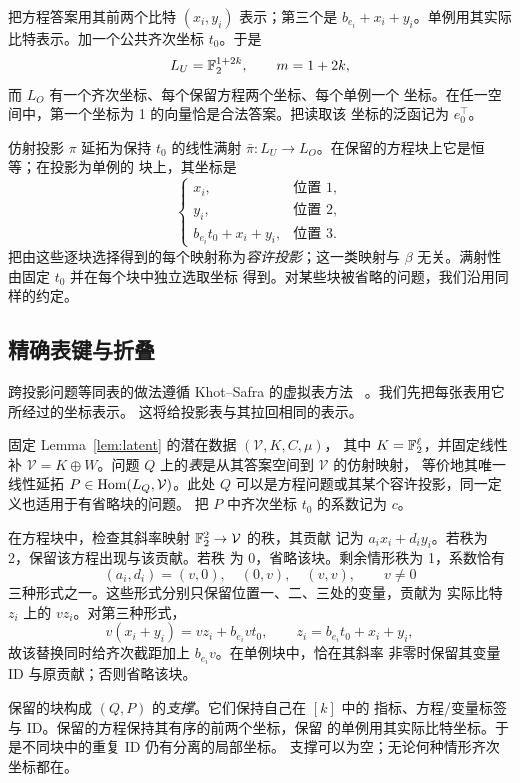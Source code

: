 把方程答案用其前两个比特 \((x_i,y_i)\) 表示；第三个是
\(b_{e_i}+x_i+y_i\)。单例用其实际比特表示。加一个公共齐次坐标
\(t_0\)。于是
\[
 L_U=\mathbb F_2^{1+2k},\qquad m=1+2k,
\]
而 \(L_O\) 有一个齐次坐标、每个保留方程两个坐标、每个单例一个
坐标。在任一空间中，第一个坐标为 1 的向量恰是合法答案。把读取该
坐标的泛函记为 \(e_0^\top\)。

仿射投影 \(\pi\) 延拓为保持 \(t_0\) 的线性满射
\(\bar\pi:L_U\to L_O\)。在保留的方程块上它是恒等；在投影为单例的
块上，其坐标是
\begin{equation}
 \begin{cases}
 x_i,&\text{位置 }1,\\
 y_i,&\text{位置 }2,\\
 b_{e_i}t_0+x_i+y_i,&\text{位置 }3.
 \end{cases}
 \label{eq:outer-projection}
\end{equation}
把由这些逐块选择得到的每个映射称为\emph{容许投影}；这一类映射与
\(\beta\) 无关。满射性由固定 \(t_0\) 并在每个块中独立选取坐标
得到。对某些块被省略的问题，我们沿用同样的约定。

\subsection{精确表键与折叠}

跨投影问题等同表的做法遵循 Khot--Safra 的虚拟表方法
~\cite[Section~1.1]{KS13}。我们先把每张表用它所经过的坐标表示。
这将给投影表与其拉回相同的表示。

固定 Lemma~\ref{lem:latent} 的潜在数据 \((\mathcal V,K,C,\mu)\)，
其中 \(K=\mathbb F_2^\ell\)，并固定线性补 \(\mathcal V=K\oplus W\)。问题
\(Q\) 上的\emph{表}是从其答案空间到 \(\mathcal V\) 的仿射映射，
等价地其唯一线性延拓 \(P\in\operatorname{Hom}(L_Q,\mathcal V)\)。此处 \(Q\)
可以是方程问题或其某个容许投影，同一定义也适用于有省略块的问题。
把 \(P\) 中齐次坐标 \(t_0\) 的系数记为 \(c\)。

在方程块中，检查其斜率映射 \(\mathbb F_2^2\to\mathcal V\) 的秩，其贡献
记为 \(a_i x_i+d_i y_i\)。若秩为 2，保留该方程出现与该贡献。若秩
为 0，省略该块。剩余情形秩为 1，系数恰有
\[
 (a_i,d_i)=(v,0),\quad (0,v),\quad (v,v),
 \qquad v\ne0
\]
三种形式之一。这些形式分别只保留位置一、二、三处的变量，贡献为
实际比特 \(z_i\) 上的 \(v z_i\)。对第三种形式，
\[
 v(x_i+y_i)=v z_i+b_{e_i}v t_0,
 \qquad z_i=b_{e_i}t_0+x_i+y_i,
\]
故该替换同时给齐次截距加上 \(b_{e_i}v\)。在单例块中，恰在其斜率
非零时保留其变量 ID 与原贡献；否则省略该块。

保留的块构成 \((Q,P)\) 的\emph{支撑}。它们保持自己在 \([k]\) 中的
指标、方程/变量标签与 ID。保留的方程保持其有序的前两个坐标，保留
的单例用其实际比特坐标。于是不同块中的重复 ID 仍有分离的局部坐标。
支撑可以为空；无论何种情形齐次坐标都在。

